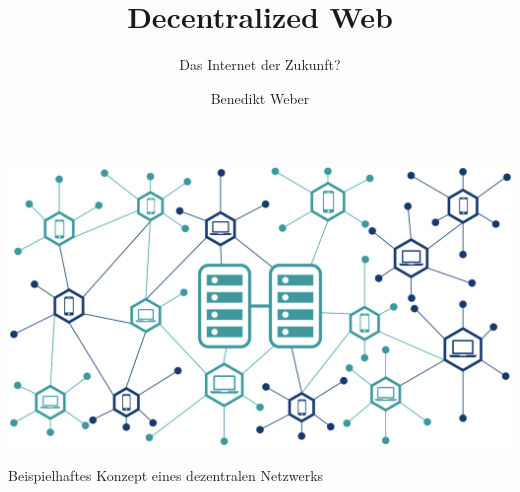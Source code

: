 \documentclass[sigplan,11pt,screen,nonacm]{acmart}
\begin{document}


\sloppy

	
\title{Decentralized Web}
\subtitle{Das Internet der Zukunft?}

\author{Benedikt Weber}

\begin{teaserfigure}
	\includegraphics[width=\textwidth]{images/teaser}
	\caption{Beispielhaftes Konzept eines dezentralen Netzwerks~\cite{shivang.2018}}
	\label{fig:teaser}
	\bigskip
\end{teaserfigure}



\maketitle









\end{document}
